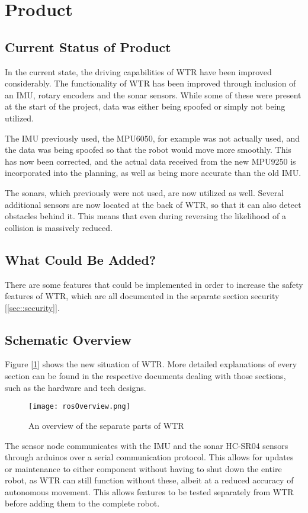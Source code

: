\section{Product}
\subsection{Current Status of Product}
In the current state, the driving capabilities of WTR have been improved considerably.
The functionality of WTR has been improved through inclusion of an IMU, rotary encoders and the sonar sensors.
While some of these were present at the start of the project, data was either being spoofed or simply not being utilized.

The IMU previously used, the MPU6050, for example was not actually used, and the data was being spoofed so that the robot would move more smoothly.
This has now been corrected, and the actual data received from the new MPU9250 is incorporated into the planning, as well as being more accurate than the old IMU.

The sonars, which previously were not used, are now utilized as well.
Several additional sensors are now located at the back of WTR, so that it can also detect obstacles behind it.
This means that even during reversing the likelihood of a collision is massively reduced.

\subsection{What Could Be Added?}
There are some features that could be implemented in order to increase the safety features of WTR, which are all documented in the separate section security [\ref{sec::security}].

\subsection{Schematic Overview}
Figure [\ref{fig::schemView}] shows the new situation of WTR.
More detailed explanations of every section can be found in the respective documents dealing with those sections, such as the hardware and tech designs.
\begin{figure}[H]
\centering
\texttt{[image: rosOverview.png]}
\caption{An overview of the separate parts of WTR}
\label{fig::schemView}
\end{figure}

The sensor node communicates with the IMU and the sonar HC-SR04 sensors through arduinos over a serial communication protocol.
This allows for updates or maintenance to either component without having to shut down the entire robot, as WTR can still function without these, albeit at a reduced accuracy of autonomous movement.
This allows features to be tested separately from WTR before adding them to the complete robot.

